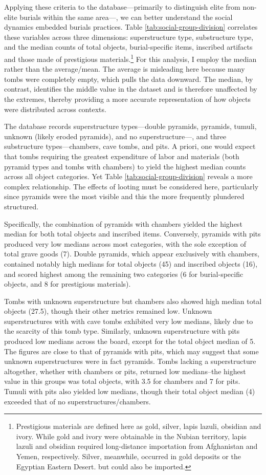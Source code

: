 Applying these criteria to the database---primarily to distinguish elite from non-elite burials within the same area---, we can better understand the social dynamics embedded burials practices. Table \ref{tab:social-group-division} correlates these variables across three dimensions: superstructure type, substructure type, and the median counts of total objects, burial-specific items, inscribed artifacts and those made of prestigious materials.\footnote{Prestigious materials are defined here as gold, silver, lapis lazuli, obsidian and ivory. While gold and ivory were obtainable in the Nubian territory, lapis lazuli and obsidian required long-distance importation from Afghanistan and Yemen, respectively. Silver, meanwhile, occurred in gold deposits or the Egyptian Eastern Desert. but could also be imported.} For this analysis, I employ the median rather than the average/mean. The average is misleading here because many tombs were completely empty, which pulls the data downward. The median, by contrast, identifies the middle value in the dataset and is therefore unaffected by the extremes, thereby providing a more accurate representation of how objects were distributed across contexts. 


The database records superstructure types---double pyramids, pyramids, tumuli, unknown (likely eroded pyramids), and no superstructure---, and three substructure types---chambers, cave tombs, and pits. A priori, one would expect that tombs requiring the greatest expenditure of labor and materials (both pyramid types and tombs with chambers) to yield the highest median counts across all object categories. Yet Table \ref{tab:social-group-division} reveals a more complex relationship. The effects of looting must be considered here, particularly since pyramids were the most visible and this the more frequently plundered structured.


Specifically, the combination of pyramids with chambers yielded the highest median for both total objects and inscribed items. Conversely, pyramids with pits produced very low medians across most categories, with the sole exception of total grave goods (7). Double pyramids, which appear exclusively with chambers, contained notably high medians for total objects (45) and inscribed objects (16), and scored highest among the remaining two categories (6 for burial-specific objects, and 8 for prestigious materials).


Tombs with unknown superstructure but chambers also showed high median total objects (27.5), though their other metrics remained low. Unknown superstructures with with cave tombs exhibited very low medians, likely due to the scarcity of this tomb type. Similarly, unknown superstructure with pits produced low medians across the board, except for the total object median of 5. The figures are close to that of pyramids with pits, which may suggest that some unknown superstructures were in fact pyramids. Tombs lacking a superstructure altogether, whether with chambers or pits, returned low medians--the highest value in this groups was total objects, with 3.5 for chambers and 7 for pits. Tumuli with pits also yielded low medians, though their total object median (4) exceeded that of no superstructures/chambers.


